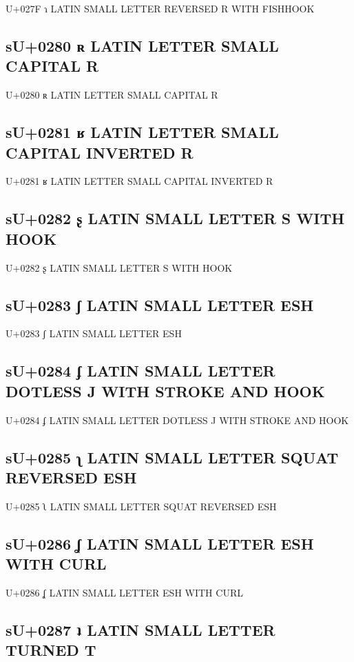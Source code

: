 U+027F ɿ LATIN SMALL LETTER REVERSED R WITH FISHHOOK

\subsection{sU+0280 ʀ LATIN LETTER SMALL CAPITAL R}

U+0280 ʀ LATIN LETTER SMALL CAPITAL R

\subsection{sU+0281 ʁ LATIN LETTER SMALL CAPITAL INVERTED R}

U+0281 ʁ LATIN LETTER SMALL CAPITAL INVERTED R

\subsection{sU+0282 ʂ LATIN SMALL LETTER S WITH HOOK}

U+0282 ʂ LATIN SMALL LETTER S WITH HOOK

\subsection{sU+0283 ʃ LATIN SMALL LETTER ESH}

U+0283 ʃ LATIN SMALL LETTER ESH

\subsection{sU+0284 ʄ LATIN SMALL LETTER DOTLESS J WITH STROKE AND HOOK}

U+0284 ʄ LATIN SMALL LETTER DOTLESS J WITH STROKE AND HOOK

\subsection{sU+0285 ʅ LATIN SMALL LETTER SQUAT REVERSED ESH}

U+0285 ʅ LATIN SMALL LETTER SQUAT REVERSED ESH

\subsection{sU+0286 ʆ LATIN SMALL LETTER ESH WITH CURL}

U+0286 ʆ LATIN SMALL LETTER ESH WITH CURL

\subsection{sU+0287 ʇ LATIN SMALL LETTER TURNED T}

